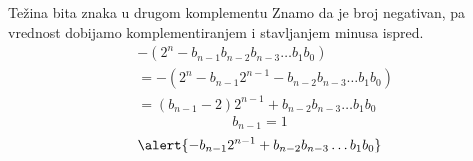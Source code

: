 \begin{frame}[label=04-s036]{Težina bita znaka u drugom komplementu}
Znamo da je broj negativan, pa vrednost dobijamo komplementiranjem i stavljanjem minusa ispred.
\[\begin{aligned}
&-\left(2^n-b_{n-1}b_{n-2}b_{n-3}\ldots b_1b_0\right)\\
&=-\left(2^n-b_{n-1}2^{n-1}-b_{n-2}b_{n-3}\ldots b_1b_0\right)\\
&=(b_{n-1}-2)2^{n-1}+b_{n-2}b_{n-3}\ldots b_1b_0
\end{aligned}\]
\[b_{n-1}=1\]
\[\alert{-b_{n-1}2^{n-1}+b_{n-2}b_{n-3}\ldots b_1b_0}\]
\end{frame}
